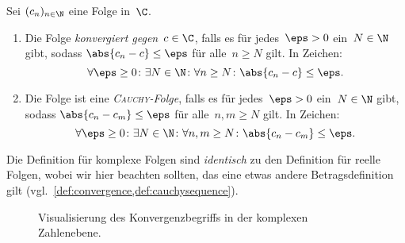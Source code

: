 \documentclass[a4paper]{article}
\begin{document}
\begin{definition}
    Sei $(c_n)_{n\in\N}$ eine Folge in~$\C$.
    \begin{enumerate}
        \item Die Folge \emph{konvergiert gegen~$c \in \C$}, falls es für jedes~$\eps > 0$ ein~$N \in \N$ gibt, sodass $\abs{c_n-c} \leq \eps$ für alle~$n \geq N$ gilt. In Zeichen:
        \begin{equation*}
            \forall \eps \geq 0\colon \exists N \in \N\colon \forall n \geq N\colon \abs{c_n-c} \leq \eps.
        \end{equation*}
        \item Die Folge ist eine \emph{\textsc{Cauchy}-Folge}, falls es für jedes~$\eps > 0$ ein~$N \in \N$ gibt, sodass $\abs{c_n-c_m} \leq \eps$ für alle~$n,m \geq N$ gilt. In Zeichen:
        \begin{equation*}
            \forall \eps \geq 0\colon \exists N \in \N\colon \forall n,m \geq N\colon \abs{c_n-c_m} \leq \eps.
        \end{equation*}
    \end{enumerate}
\end{definition}

Die Definition für komplexe Folgen sind \emph{identisch} zu den Definition für reelle Folgen, wobei wir hier beachten sollten, das eine etwas andere Betragsdefinition gilt (vgl.\ \cref{def:convergence,def:cauchysequence}).

\begin{figure}
    \caption{Visualisierung des Konvergenzbegriffs in der komplexen Zahlenebene.}
\end{figure}
\end{document}
